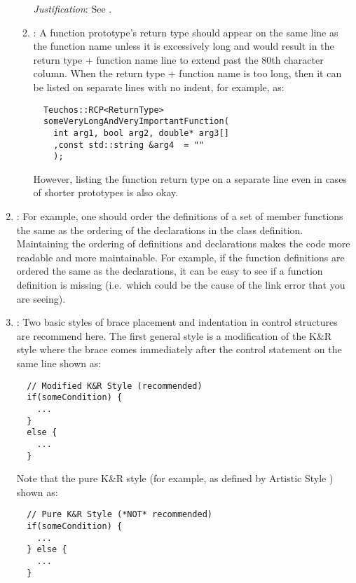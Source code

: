 \begin{enumerate}
\begin{enumerate}
  {}\textit{Justification}: See {}\cite[Section 31.1]{CodeComplete2nd04}.
  
  {}\item\FSCFunctionReturn: A function prototype's return type should appear
  on the same line as the function name unless it is excessively long and
  would result in the return type + function name line to extend past the 80th
  character column.  When the return type + function name is too long, then it
  can be listed on separate lines with no indent, for example, as:
  
  {\small\begin{verbatim}
  Teuchos::RCP<ReturnType>
  someVeryLongAndVeryImportantFunction(
    int arg1, bool arg2, double* arg3[]
    ,const std::string &arg4  = ""
    );
  \end{verbatim}}

  However, listing the function return type on a separate line even in cases
  of shorter prototypes is also okay.

  \end{enumerate}

{}\item\FSCOrderFunctionDefinitions: For example, one should order the
definitions of a set of member functions the same as the ordering of the
declarations in the class definition.  Maintaining the ordering of definitions
and declarations makes the code more readable and more maintainable.  For
example, if the function definitions are ordered the same as the declarations,
it can be easy to see if a function definition is missing (i.e.\ which could
be the cause of the link error that you are seeing).

{}\item\FSCBracePlacement: Two basic styles of brace placement and indentation
in control structures are recommend here.  The first general style is a
modification of the K\&R style{}\cite{ArtisticStyle} where the brace comes
immediately after the control statement on the same line shown as:

{\small\begin{verbatim}
  // Modified K&R Style (recommended)
  if(someCondition) {
    ...
  }
  else {
    ...
  }
\end{verbatim}}

Note that the pure K\&R style (for example, as defined by Artistic Style
{}\cite{ArtisticStyle}) shown as:

{\small\begin{verbatim}
  // Pure K&R Style (*NOT* recommended)
  if(someCondition) {
    ...
  } else {
    ...
  }
\end{verbatim}}


\end{enumerate}
